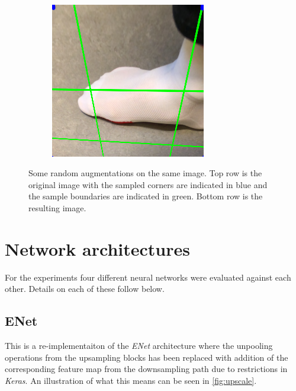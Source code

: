 \documentclass{kththesis}
\begin{document}
\begin{figure}[h]
\begin{subfigure}[b]{0.3\textwidth}
      \end{subfigure}
    ~
    \begin{subfigure}[b]{0.3\textwidth}
        \includegraphics[width=\textwidth]{augmented3}
      \end{subfigure}
      \caption{Some random augmentations on the same image. Top row is the
        original image with the sampled corners are indicated in blue and
        the sample boundaries are indicated in green. Bottom row is the
        resulting image.}\label{fig:augment}
\end{figure}


\section{Network architectures}
For the experiments four different neural networks were evaluated against each
other. Details on each of these follow below. 

\subsection*{ENet}
This is a re-implementaiton of the \textit{ENet} architecture
\parencite{paszke2016enet} where the unpooling operations from the upsampling
blocks has been replaced with addition of the corresponding feature map from the
downsampling path due to restrictions in \textit{Keras}. An illustration of what
this means can be seen in \cref{fig:upscale}.
\end{document}
